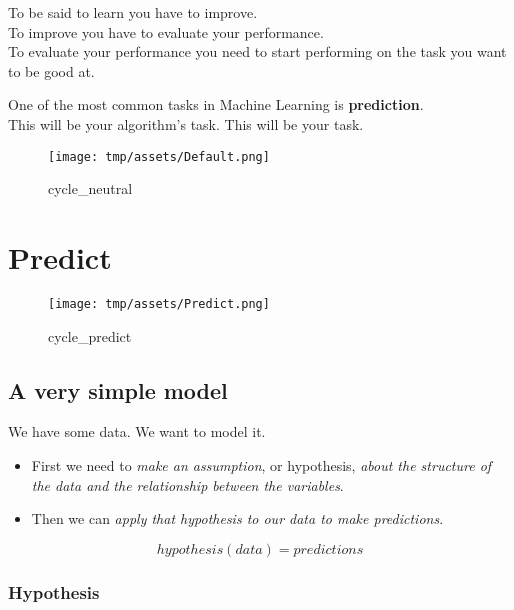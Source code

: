 \documentclass[]{article}
\begin{document}
To be said to learn you have to improve.\\
To improve you have to evaluate your performance.\\
To evaluate your performance you need to start performing on the task
you want to be good at.

One of the most common tasks in Machine Learning is
\textbf{prediction}.\\
This will be your algorithm's task. This will be your task.

\begin{figure}
\centering
\texttt{[image: tmp/assets/Default.png]}
\caption{cycle\_neutral}
\end{figure}

\clearpage

\hypertarget{predict}{%
\section{Predict}\label{predict}}

\begin{figure}
\centering
\texttt{[image: tmp/assets/Predict.png]}
\caption{cycle\_predict}
\end{figure}

\hypertarget{a-very-simple-model}{%
\subsection{A very simple model}\label{a-very-simple-model}}

We have some data. We want to model it.

\begin{itemize}
\item
  First we need to \emph{make an assumption}, or hypothesis, \emph{about
  the structure of the data and the relationship between the variables}.
\item
  Then we can \emph{apply that hypothesis to our data to make
  predictions}.
\end{itemize}

\large

\[
hypothesis(data) = predictions
\] \normalsize

\hypertarget{hypothesis}{%
\subsubsection{Hypothesis}\label{hypothesis}}
\end{document}
